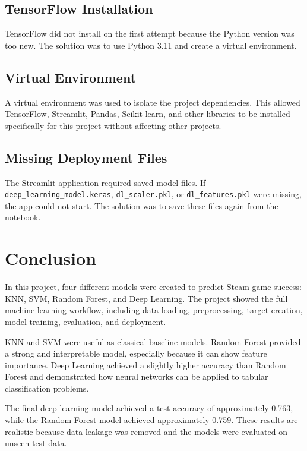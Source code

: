 \documentclass[12pt,a4paper]{article}
\begin{document}
\subsection{TensorFlow Installation}

TensorFlow did not install on the first attempt because the Python version was too new. The solution was to use Python 3.11 and create a virtual environment.

\subsection{Virtual Environment}

A virtual environment was used to isolate the project dependencies. This allowed TensorFlow, Streamlit, Pandas, Scikit-learn, and other libraries to be installed specifically for this project without affecting other projects.

\subsection{Missing Deployment Files}

The Streamlit application required saved model files. If \texttt{deep\_learning\_model.keras}, \texttt{dl\_scaler.pkl}, or \texttt{dl\_features.pkl} were missing, the app could not start. The solution was to save these files again from the notebook.

\section{Conclusion}

In this project, four different models were created to predict Steam game success: KNN, SVM, Random Forest, and Deep Learning. The project showed the full machine learning workflow, including data loading, preprocessing, target creation, model training, evaluation, and deployment.

KNN and SVM were useful as classical baseline models. Random Forest provided a strong and interpretable model, especially because it can show feature importance. Deep Learning achieved a slightly higher accuracy than Random Forest and demonstrated how neural networks can be applied to tabular classification problems.

The final deep learning model achieved a test accuracy of approximately 0.763, while the Random Forest model achieved approximately 0.759. These results are realistic because data leakage was removed and the models were evaluated on unseen test data.
\end{document}
